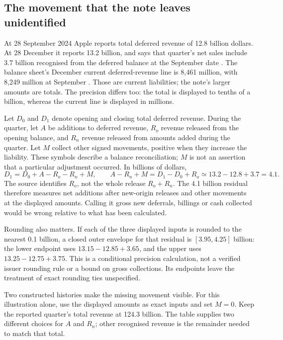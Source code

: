 \subsection{The movement that the note leaves unidentified}

At 28 September 2024 Apple reports total deferred revenue of 12.8 billion
dollars. At 28 December it reports 13.2 billion, and says that quarter's net
sales include 3.7 billion recognised from the deferred balance at the September
date \citep[Note 2, printed p.~6]{apple2025q1}. The balance sheet's December
current deferred-revenue line is 8,461 million, with 8,249 million at September
\citep[printed p.~3]{apple2025q1}. Those are current liabilities; the note's
larger amounts are totals. The precision differs too: the total is displayed
to tenths of a billion, whereas the current line is displayed in millions.

Let $D_0$ and $D_1$ denote opening and closing total deferred revenue. During
the quarter, let $A$ be additions to deferred revenue, $R_o$ revenue released
from the opening balance, and $R_n$ revenue released from amounts added during
the quarter. Let $M$ collect other signed movements, positive when they increase
the liability. These symbols describe a balance reconciliation; $M$ is not an
assertion that a particular adjustment occurred. In billions of dollars,
\begin{equation}
 D_1=D_0+A-R_o-R_n+M,
 \qquad A-R_n+M=D_1-D_0+R_o\simeq13.2-12.8+3.7=4.1.
 \label{eq:apple-deferred-movement}
\end{equation}
The source identifies $R_o$, not the whole release $R_o+R_n$. The 4.1 billion
residual therefore measures net additions after new-origin releases and other
movements at the displayed amounts. Calling it gross new deferrals, billings
or cash collected would be wrong relative to what has been calculated.

Rounding also matters. If each of the three displayed inputs is rounded to the
nearest 0.1 billion, a closed outer envelope for that residual is
$[3.95,4.25]$ billion: the lower endpoint uses $13.15-12.85+3.65$, and the
upper uses $13.25-12.75+3.75$. This is a conditional precision calculation,
not a verified issuer rounding rule or a bound on gross collections. Its
endpoints leave the treatment of exact rounding ties unspecified.

Two constructed histories make the missing movement visible. For this
illustration alone, use the displayed amounts as exact inputs and set $M=0$.
Keep the reported quarter's total revenue at 124.3 billion. The table supplies
two different choices for $A$ and $R_n$; other recognised revenue is the
remainder needed to match that total.


